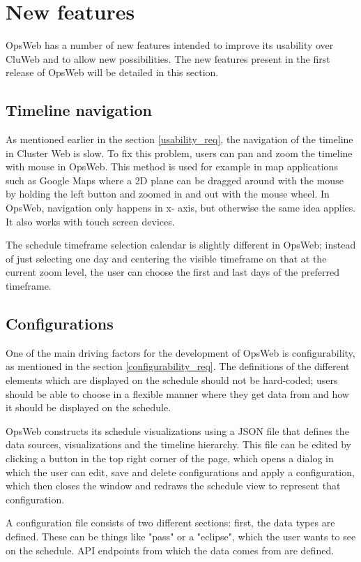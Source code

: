 \section{New features}
OpsWeb has a number of new features intended to improve its usability over CluWeb and to allow new possibilities. The new features present in the first release of OpsWeb will be detailed in this section.

\subsection{Timeline navigation}
As mentioned earlier in the section \ref{usability_req}, the navigation of the timeline in Cluster Web is slow. To fix this problem, users can pan and zoom the timeline with mouse in OpsWeb. This method is used for example in map applications such as Google Maps where a 2D plane can be dragged around with the mouse by holding the left button and zoomed in and out with the mouse wheel. In OpsWeb, navigation only happens in x- axis, but otherwise the same idea applies. It also works with touch screen devices.

The schedule timeframe selection calendar is slightly different in OpsWeb; instead of just selecting one day and centering the visible timeframe on that at the current zoom level, the user can choose the first and last days of the preferred timeframe.

\subsection{Configurations}
One of the main driving factors for the development of OpsWeb is configurability, as mentioned in the section \ref{configurability_req}. The definitions of the different elements which are displayed on the schedule should not be hard-coded; users should be able to choose in a flexible manner where they get data from and how it should be displayed on the schedule.

OpsWeb constructs its schedule visualizations using a JSON file that defines the data sources, visualizations and the timeline hierarchy. This file can be edited by clicking a button in the top right corner of the page, which opens a dialog in which the user can edit, save and delete configurations and apply a configuration, which then closes the window and redraws the schedule view to represent that configuration.

A configuration file consists of two different sections: first, the data types are defined. These can be things like "pass" or a "eclipse", which the user wants to see on the schedule. API endpoints from which the data comes from are defined.

